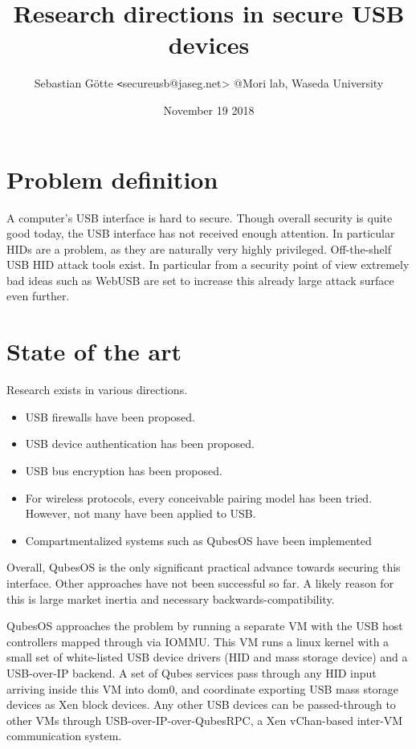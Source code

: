 \documentclass[12pt,a4paper,notitlepage]{article}
\author{Sebastian Götte {\texttt<secureusb@jaseg.net>} @Mori lab, Waseda University}
\title{Research directions in secure USB devices}
\date{November 19 2018}
\begin{document}
\maketitle

\section{Problem definition}
A computer's USB interface is hard to secure. Though overall security is quite good today, the USB interface has not
received enough attention. In particular HIDs are a problem, as they are naturally very highly privileged.
Off-the-shelf USB HID attack tools exist. In particular from a security point of view extremely bad ideas such as
WebUSB\cite{misc01} are set to increase this already large attack surface even further.

\section{State of the art}
Research exists in various directions.
\begin{itemize}
    \item USB firewalls have been proposed\cite{tian01,angel01,kang01,bates01,loe01}.
    \item USB device authentication has been proposed\cite{usb01,griscioli01,wang01,he01}.
    \item USB bus encryption has been proposed\cite{neugschwandtner01,weinstein01}.
    \item For wireless protocols, every conceivable pairing model has been tried. However, not many have been applied to
        USB\cite{arun01,uzun01,kobsa01,saxena01}.
    \item Compartmentalized systems such as QubesOS have been implemented
\end{itemize}

Overall, QubesOS is the only significant practical advance towards securing this interface. Other approaches have not
been successful so far. A likely reason for this is large market inertia and necessary backwards-compatibility.

QubesOS approaches the problem by running a separate VM with the USB host controllers mapped through via IOMMU. This VM
runs a linux kernel with a small set of white-listed USB device drivers (HID and mass storage device) and a USB-over-IP
backend. A set of Qubes services pass through any HID input arriving inside this VM into dom0, and coordinate exporting
USB mass storage devices as Xen block devices. Any other USB devices can be passed-through to other VMs through
USB-over-IP-over-QubesRPC, a Xen vChan-based inter-VM communication system.
\end{document}
